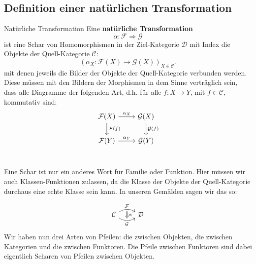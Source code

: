 \documentclass[a4paper]{amsart}
\theoremstyle{definition}
\begin{document}
\subsection{Definition einer natürlichen Transformation}
\begin{Definition}{Natürliche Transformation}
   Eine \textbf{natürliche Transformation} 
   \begin{equation}
      \alpha \colon \mathcal F \Rightarrow \mathcal G
   \end{equation}
   ist eine Schar von Homomorphismen in der Ziel-Kategorie $\mathcal{D}$ mit Index die Objekte der Quell-Kategorie $\mathcal C$:
   \begin{equation}
      \left (\alpha_X \colon \mathcal F(X) \to \mathcal G(X) \right )_{X \in \mathcal C}.
   \end{equation}
   mit denen jeweils die Bilder der Objekte der Quell-Kategorie verbunden werden. Diese müssen mit den Bildern der Morphismen in dem Sinne verträglich sein, dass alle Diagramme der folgenden Art, d.h. für alle $f \colon X \to Y$, mit $f \in \mathcal C$, kommutativ sind:
   \begin{equation}\label{kommutativ}
      \begin{tikzcd}
         \mathcal F(X) \arrow[r, "\alpha_X"] \arrow[d, "\mathcal F(f)"]
            & \mathcal  G(X) \arrow[d, "\mathcal G(f)"]\\
         \mathcal F(Y) \arrow[r, "\alpha_Y"]  
            & \mathcal  G(Y)\\
      \end{tikzcd}
   \end{equation}
\end{Definition}

Eine Schar ist nur ein anderes Wort für Familie oder Funktion. Hier müssen wir auch Klassen-Funktionen zulassen, da die Klasse der Objekte der Quell-Kategorie durchaus eine echte Klasse sein kann. In unseren Gemälden sagen wir das so:

\begin{equation}
   \begin{tikzcd}
      \mathcal C 
         \arrow[r, bend left, "\mathcal F"{name=0}] 
         \arrow[r, bend right, swap, "\mathcal G"{name=1}] 
         \arrow[Rightarrow, from=0, to=1,shorten >= 6pt, yshift = -3pt, "\alpha"{yshift=3pt}]
      & \mathcal D
   \end{tikzcd}
\end{equation}
Wir haben nun drei Arten von Pfeilen: die zwischen Objekten, die zwischen Kategorien und die zwischen Funktoren. Die Pfeile zwischen Funktoren sind dabei eigentlich Scharen von Pfeilen zwischen Objekten.
\end{document}
